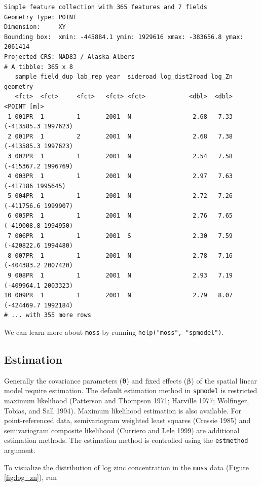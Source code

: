 \documentclass{article}
\begin{document}
\begin{verbatim}
Simple feature collection with 365 features and 7 fields
Geometry type: POINT
Dimension:     XY
Bounding box:  xmin: -445884.1 ymin: 1929616 xmax: -383656.8 ymax: 2061414
Projected CRS: NAD83 / Alaska Albers
# A tibble: 365 x 8
   sample field_dup lab_rep year  sideroad log_dist2road log_Zn            geometry
   <fct>  <fct>     <fct>   <fct> <fct>            <dbl>  <dbl>         <POINT [m]>
 1 001PR  1         1       2001  N                 2.68   7.33 (-413585.3 1997623)
 2 001PR  1         2       2001  N                 2.68   7.38 (-413585.3 1997623)
 3 002PR  1         1       2001  N                 2.54   7.58 (-415367.2 1996769)
 4 003PR  1         1       2001  N                 2.97   7.63   (-417186 1995645)
 5 004PR  1         1       2001  N                 2.72   7.26 (-411756.6 1999907)
 6 005PR  1         1       2001  N                 2.76   7.65 (-419008.8 1994950)
 7 006PR  1         1       2001  S                 2.30   7.59 (-420822.6 1994480)
 8 007PR  1         1       2001  N                 2.78   7.16 (-404383.2 2007420)
 9 008PR  1         1       2001  N                 2.93   7.19 (-409964.1 2003323)
10 009PR  1         1       2001  N                 2.79   8.07 (-424469.7 1992184)
# ... with 355 more rows
\end{verbatim}

We can learn more about \texttt{moss} by running
\texttt{help("moss",\ "spmodel")}.

\hypertarget{estimation}{%
\subsection{Estimation}\label{estimation}}

Generally the covariance parameters (\(\boldsymbol{\theta}\)) and fixed
effects (\(\boldsymbol{\beta}\)) of the spatial linear model require
estimation. The default estimation method in \texttt{spmodel} is
restricted maximum likelihood (Patterson and Thompson 1971; Harville
1977; Wolfinger, Tobias, and Sall 1994). Maximum likelihood estimation
is also available. For point-referenced data, semivariogram weighted
least squares (Cressie 1985) and semivariogram composite likelihood
(Curriero and Lele 1999) are additional estimation methods. The
estimation method is controlled using the \texttt{estmethod} argument.

To visualize the distribution of log zinc concentration in the
\texttt{moss} data (Figure\(~\)\ref{fig:log_zn}), run
\end{document}
